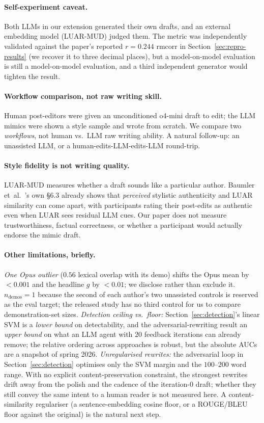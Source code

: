 \documentclass[runningheads]{llncs}
\begin{document}
\paragraph{Self-experiment caveat.}
Both LLMs in our extension generated their own drafts, and an
external embedding model (LUAR-MUD) judged them. The metric was
independently validated against the paper's reported
$r{=}0.244$ rmcorr in
Section~\ref{sec:repro-results} (we recover it to three decimal
places), but a model-on-model evaluation is still a model-on-model
evaluation, and a third independent generator would tighten the
result.

\paragraph{Workflow comparison, not raw writing skill.}
Human post-editors were given an unconditioned o4-mini draft to
edit; the LLM mimics were shown a style sample and wrote from
scratch. We compare two \emph{workflows}, not human vs.\ LLM raw
writing ability. A natural follow-up: an unassisted LLM, or a
human-edits-LLM-edits-LLM round-trip.

\paragraph{Style fidelity is not writing quality.}
LUAR-MUD measures whether a draft sounds like a particular author.
Baumler et~al.~\cite{baumler2026personalstyle}'s own \S6.3 already
shows that \emph{perceived} stylistic authenticity and LUAR
similarity can come apart, with participants rating their post-edits
as authentic even when LUAR sees residual LLM cues. Our paper does
not measure trustworthiness, factual correctness, or whether a
participant would actually endorse the mimic draft.

\paragraph{Other limitations, briefly.}
\textit{One Opus outlier} ($0.56$ lexical overlap with its demo)
shifts the Opus mean by $<0.001$ and the headline $g$ by $<0.01$;
we disclose rather than exclude it.
\textit{$n_{\text{demos}}{=}1$} because the second of each
author's two unassisted controls is reserved as the eval target;
the released study has no third control for us to compare
demonstration-set sizes.
\textit{Detection ceiling vs.\ floor:} Section~\ref{sec:detection}'s
linear SVM is a \emph{lower bound} on detectability, and the
adversarial-rewriting result an \emph{upper bound} on what an LLM
agent with $20$ feedback iterations can already remove; the
relative ordering across approaches is robust, but the absolute
AUCs are a snapshot of spring 2026.
\textit{Unregularised rewrites:} the adversarial loop in
Section~\ref{sec:detection} optimises only the SVM margin and the
$100$--$200$ word range. With no explicit content-preservation
constraint, the strongest rewrites drift away from the polish and
the cadence of the iteration-$0$ draft; whether they still convey
the same intent to a human reader is not measured here. A
content-similarity regulariser (a sentence-embedding cosine floor,
or a ROUGE/BLEU floor against the original) is the natural next
step.
\end{document}
